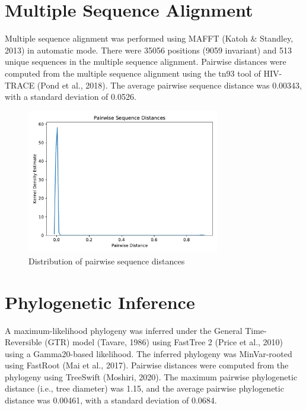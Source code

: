 \documentclass{article}
\begin{document}
\section{Multiple Sequence Alignment}
Multiple sequence alignment was performed using MAFFT (Katoh \& Standley, 2013) in automatic mode.
There were 35056 positions (9059 invariant) and 513 unique sequences in the multiple sequence alignment.
Pairwise distances were computed from the multiple sequence alignment using the tn93 tool of HIV-TRACE (Pond et al., 2018).
The average pairwise sequence distance was 0.00343,
with a standard deviation of 0.0526.


\begin{figure}[h]
\centering
\includegraphics[width=0.75\textwidth,keepaspectratio]{./figs/pairwise_distances_sequences.pdf}
\caption{Distribution of pairwise sequence distances}
\end{figure}

\section{Phylogenetic Inference}
A maximum-likelihood phylogeny was inferred under the General Time-Reversible (GTR) model (Tavare, 1986) using FastTree 2 (Price et al., 2010) using a Gamma20-based likelihood.
The inferred phylogeny was MinVar-rooted using FastRoot (Mai et al., 2017).
Pairwise distances were computed from the phylogeny using TreeSwift (Moshiri, 2020).
The maximum pairwise phylogenetic distance (i.e., tree diameter) was 1.15,
and the average pairwise phylogenetic distance was 0.00461,
with a standard deviation of 0.0684.
\end{document}
